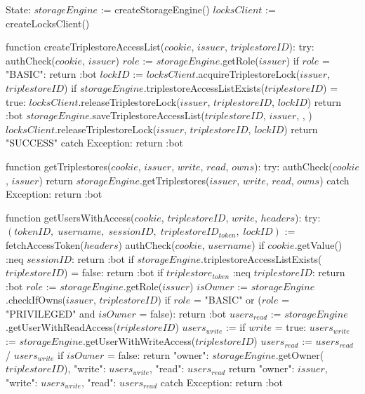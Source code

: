 State:
    $storageEngine$ := createStorageEngine()
    $locksClient$ := createLocksClient()

function createTriplestoreAccessList($cookie$, $issuer$, $triplestoreID$):
    try:
        authCheck($cookie$, $issuer$)
        $role$ := $storageEngine$.getRole($issuer$)
        if $role$ = "BASIC":
            return :bot
        $lockID$ := $locksClient$.acquireTriplestoreLock($issuer$, $triplestoreID$)
        if $storageEngine$.triplestoreAccessListExists($triplestoreID$) = true:
            $locksClient$.releaseTriplestoreLock($issuer$, $triplestoreID$, $lockID$)
            return :bot
        $storageEngine$.saveTriplestoreAccessList($triplestoreID$, $issuer$, {}, {})
        $locksClient$.releaseTriplestoreLock($issuer$, $triplestoreID$, $lockID$)
        return "SUCCESS"
    catch Exception: 
        return :bot

function getTriplestores($cookie$, $issuer$, $write$, $read$, $owns$):
    try:
        authCheck($cookie$, $issuer$)
        return $storageEngine$.getTriplestores($issuer$, $write$, $read$, $owns$)
    catch Exception: 
       return :bot

function getUsersWithAccess($cookie$, $triplestoreID$, $write$, $headers$):
    try:
        $(tokenID, \; username, \; sessionID, \; triplestoreID_{token}, \; lockID)$ := fetchAccessToken($headers$)
        authCheck($cookie$, $username$)
        if $cookie$.getValue() :neq $sessionID$: 
            return :bot
        if $storageEngine$.triplestoreAccessListExists($triplestoreID$) = false:
            return :bot
        if $triplestore_{token}$ :neq $triplestoreID$:
            return :bot
        $role$ := $storageEngine$.getRole($issuer$)
        $isOwner$ := $storageEngine$.checkIfOwns($issuer$, $triplestoreID$)
        if $role$ = "BASIC" or ($role$ = "PRIVILEGED" and $isOwner$ = false):
            return :bot
        $users_{read}$ := $storageEngine$.getUserWithReadAccess($triplestoreID$)
        $users_{write}$ := {}
        if $write$ = true:
            $users_{write}$ := $storageEngine$.getUserWithWriteAccess($triplestoreID$)
            $users_{read}$ := $users_{read}$ / $users_{write}$
        if $isOwner$ = false:
            return {
                "owner": $storageEngine$.getOwner($triplestoreID$),
                "write": $users_{write}$,
                "read": $users_{read}$
            }
        return {
            "owner": $issuer$,
            "write": $users_{write}$,
            "read": $users_{read}$
        }
    catch Exception: 
       return :bot

